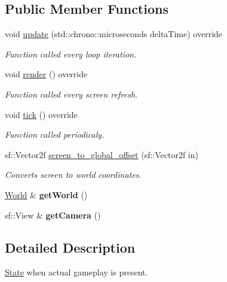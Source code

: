 \subsection*{Public Member Functions}
\begin{DoxyCompactItemize}
\item 
void \hyperlink{classGameState_aba059d7ab1a53b8f5d795292ed37abac}{update} (std\-::chrono\-::microseconds delta\-Time) override
\begin{DoxyCompactList}\small\item\em Function called every loop iteration. \end{DoxyCompactList}\item 
void \hyperlink{classGameState_a2c36ada0cae89f91d956e2c91b070893}{render} () override
\begin{DoxyCompactList}\small\item\em Function called every screen refresh. \end{DoxyCompactList}\item 
void \hyperlink{classGameState_ae9ff24d75f36ef56daa6a180d4b38a09}{tick} () override
\begin{DoxyCompactList}\small\item\em Function called periodicaly. \end{DoxyCompactList}\item 
\hypertarget{classGameState_a945e9dfe15e3708799977ed8133f7678}{sf\-::\-Vector2f \hyperlink{classGameState_a945e9dfe15e3708799977ed8133f7678}{screen\-\_\-to\-\_\-global\-\_\-offset} (sf\-::\-Vector2f in)}\label{classGameState_a945e9dfe15e3708799977ed8133f7678}

\begin{DoxyCompactList}\small\item\em Converts screen to world coordinates. \end{DoxyCompactList}\item 
\hypertarget{classGameState_aebc076f9bcec0aa4317eff9e9a8d566e}{\hyperlink{classWorld}{World} \& {\bfseries get\-World} ()}\label{classGameState_aebc076f9bcec0aa4317eff9e9a8d566e}

\item 
\hypertarget{classGameState_a45607b8a0473073090740500826268c0}{sf\-::\-View \& {\bfseries get\-Camera} ()}\label{classGameState_a45607b8a0473073090740500826268c0}

\end{DoxyCompactItemize}


\subsection{Detailed Description}
\hyperlink{classState}{State} when actual gameplay is present. 

